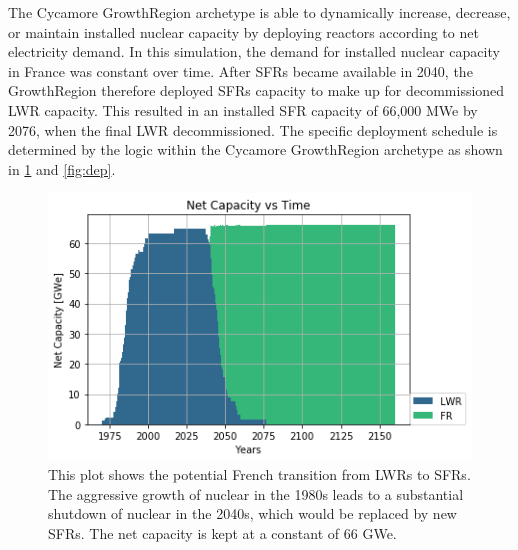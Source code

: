 The Cycamore GrowthRegion archetype is able to dynamically increase, decrease,
or maintain installed nuclear capacity by deploying reactors according to net
electricity demand. In this simulation, the demand for installed nuclear
capacity in France was constant over time. After \glspl{SFR} became available
in 2040, the GrowthRegion therefore deployed \glspl{SFR} capacity to make up
for decommissioned \gls{LWR} capacity.  This resulted in an installed
\gls{SFR} capacity of 66,000 MWe by 2076, when the final \gls{LWR}
decommissioned. The specific deployment schedule is determined by the logic
within the Cycamore GrowthRegion archetype as shown in \cref{fig:sfr_num} and
\cref{fig:dep}. 

\begin{figure}[htbp!]
        \begin{center}
                \includegraphics[scale=0.6]{./images/french-transition/power_plot.png}
        \caption{This plot shows the potential French transition from \glspl{LWR} to \glspl{SFR}.
                 The aggressive growth of nuclear in the 1980s leads to a substantial shutdown
                 of nuclear in the 2040s, which would be replaced by new \glspl{SFR}. The net
                 capacity is kept at a constant of 66 GWe.}
        \label{fig:sfr_num}
        \end{center}
\end{figure}

